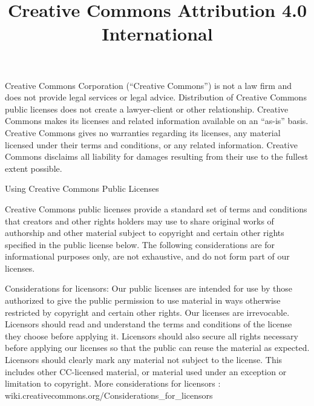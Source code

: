 \documentclass[a4paper, 12pt]{article}
\begin{document}
\title{Creative Commons Attribution 4.0 International}
\date{}

\maketitle

Creative Commons Corporation (``Creative Commons'') is not a law firm and does not provide legal services or legal advice. Distribution of Creative Commons public licenses does not create a lawyer-client or other relationship. Creative Commons makes its licenses and related information available on an ``as-is'' basis. Creative Commons gives no warranties regarding its licenses, any material licensed under their terms and conditions, or any related information. Creative Commons disclaims all liability for damages resulting from their use to the fullest extent possible.

\vspace{0.5cm}

Using Creative Commons Public Licenses

\vspace{0.5cm}

Creative Commons public licenses provide a standard set of terms and conditions that creators and other rights holders may use to share original works of authorship and other material subject to copyright and certain other rights specified in the public license below. The following considerations are for informational purposes only, are not exhaustive, and do not form part of our licenses.

\vspace{0.5cm}

Considerations for licensors: Our public licenses are intended for use by those authorized to give the public permission to use material in ways otherwise restricted by copyright and certain other rights. Our licenses are irrevocable. Licensors should read and understand the terms and conditions of the license they choose before applying it. Licensors should also secure all rights necessary before applying our licenses so that the public can reuse the material as expected. Licensors should clearly mark any material not subject to the license. This includes other CC-licensed material, or material used under an exception or limitation to copyright. More considerations for licensors : wiki.creativecommons.org/Considerations\_for\_licensors

\vspace{0.5cm}
\end{document}

